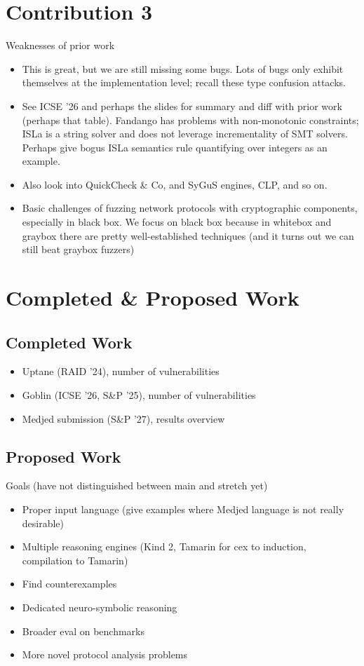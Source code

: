 \documentclass{article}
\theoremstyle{definition}
\begin{document}
\section {Contribution 3}
Weaknesses of prior work
\begin{itemize}
  \item This is great, but we are still missing some bugs. 
  Lots of bugs only exhibit themselves at the implementation level; recall these type confusion attacks.
  \item See ICSE '26 and perhaps the slides for summary and diff with prior work (perhaps that table). 
  Fandango has problems with non-monotonic constraints; ISLa is a string solver and does not leverage 
  incrementality of SMT solvers. Perhaps give bogus ISLa semantics rule quantifying over integers 
  as an example. 
  \item Also look into QuickCheck \& Co, and SyGuS engines, CLP, and so on.
  \item Basic challenges of fuzzing network protocols with cryptographic components, especially in black box. 
  We focus on black box because in whitebox and graybox there are pretty well-established techniques 
  (and it turns out we can still beat graybox fuzzers)
\end{itemize}


\section{Completed \& Proposed Work}
\subsection{Completed Work}
\begin{itemize}
  \item Uptane (RAID '24), number of vulnerabilities
  \item Goblin (ICSE '26, S\&P '25), number of vulnerabilities
  \item Medjed submission (S\&P '27), results overview 
\end{itemize}

\subsection{Proposed Work}

Goals (have not distinguished between main and stretch yet)
\begin{itemize}
  \item Proper input language (give examples where Medjed language is not really desirable)
  \item Multiple reasoning engines (Kind 2, Tamarin for cex to induction, compilation to Tamarin)
  \item Find counterexamples 
  \item Dedicated neuro-symbolic reasoning 
  \item Broader eval on benchmarks 
  \item More novel protocol analysis problems
\end{itemize}
\end{document}

